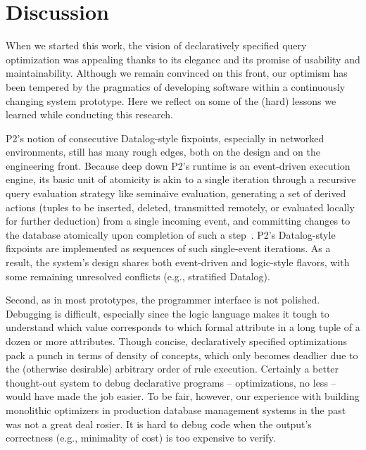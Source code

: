 \section{Discussion}
\label{ch:opt:sec:discussion}

When we started this work, the vision of declaratively specified query
optimization was appealing thanks to its elegance and its promise of usability
and maintainability.  Although we remain convinced on this front, our optimism
has been tempered by the pragmatics of developing software within a
continuously changing system prototype.  Here we reflect on some of the (hard)
lessons we learned while conducting this research.

P2's notion of consecutive Datalog-style fixpoints, especially in networked
environments, still has many rough edges, both on the design and on the
engineering front.  Because deep down P2's runtime is an event-driven execution
engine, its basic unit of atomicity is akin to a single iteration through a
recursive query evaluation strategy like semina\"{\i}ve evaluation, generating a
set of derived actions (tuples to be inserted, deleted, transmitted remotely,
or evaluated locally for further deduction) from a single incoming event, and
committing changes to the database atomically upon completion of such a
step~\cite{LuThesis}.  P2's Datalog-style fixpoints are implemented as
sequences of such single-event iterations.  As a result, the system's design
shares both event-driven and logic-style flavors, with some remaining
unresolved conflicts (e.g., stratified Datalog).


Second, as in most prototypes, the programmer interface is not polished.
Debugging is difficult, especially since the logic language makes it tough to
understand which value corresponds to which formal attribute in a long tuple of
a dozen or more attributes.  Though concise, declaratively specified
optimizations pack a punch in terms of density of concepts, which only becomes
deadlier due to the (otherwise desirable) arbitrary order of rule execution.
Certainly a better thought-out system to debug declarative programs --
optimizations, no less -- would have made the job easier.  To be fair, however,
our experience with building monolithic optimizers in production database
management systems in the past was not a great deal rosier.  It is hard to
debug code when the output's correctness (e.g., minimality of cost) is too
expensive to verify.


